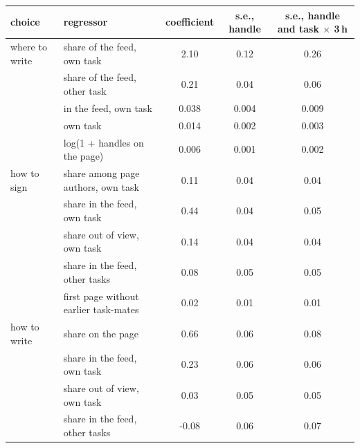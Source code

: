 \begin{tabular}{llccc}
\toprule
choice & regressor & coefficient & s.e., handle & s.e., handle and task $\times$ 3\,h \\
\midrule
where to write & share of the feed, own task & 2.10 & 0.12 & 0.26 \\
 & share of the feed, other task & 0.21 & 0.04 & 0.06 \\
 & in the feed, own task & 0.038 & 0.004 & 0.009 \\
 & own task & 0.014 & 0.002 & 0.003 \\
 & log(1 + handles on the page) & 0.006 & 0.001 & 0.002 \\
how to sign & share among page authors, own task & 0.11 & 0.04 & 0.04 \\
 & share in the feed, own task & 0.44 & 0.04 & 0.05 \\
 & share out of view, own task & 0.14 & 0.04 & 0.04 \\
 & share in the feed, other tasks & 0.08 & 0.05 & 0.05 \\
 & first page without earlier task-mates & 0.02 & 0.01 & 0.01 \\
how to write & share on the page & 0.66 & 0.06 & 0.08 \\
 & share in the feed, own task & 0.23 & 0.06 & 0.06 \\
 & share out of view, own task & 0.03 & 0.05 & 0.05 \\
 & share in the feed, other tasks & -0.08 & 0.06 & 0.07 \\
\bottomrule
\end{tabular}
